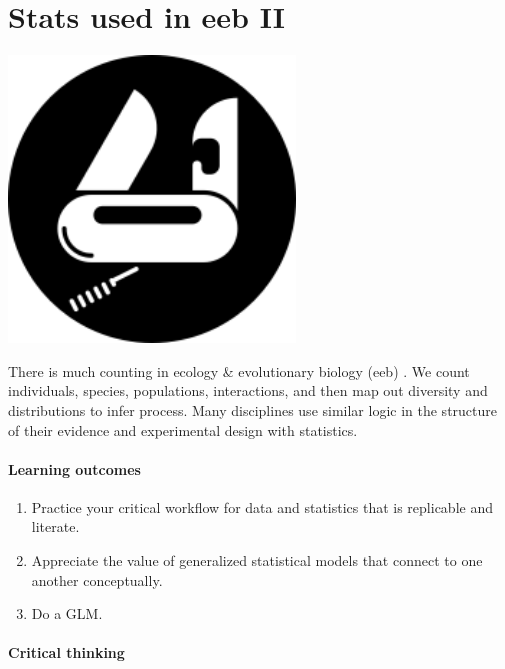 \documentclass[
]{book}
\providecommand{\tightlist}{%
  \setlength{\itemsep}{0pt}\setlength{\parskip}{0pt}}
\begin{document}
\hypertarget{eebII}{%
\chapter{Stats used in eeb II}\label{eebII}}

\includegraphics[width=3in,height=\textheight]{./eebII.png}

There is much counting in ecology \& evolutionary biology (eeb) \citep{RN7219}. We count individuals, species, populations, interactions, and then map out diversity and distributions to infer process. Many disciplines use similar logic in the structure of their evidence and experimental design with statistics.

\hypertarget{learning-outcomes-4}{%
\subsubsection*{Learning outcomes}\label{learning-outcomes-4}}

\begin{enumerate}
\def\labelenumi{\arabic{enumi}.}
\tightlist
\item
  Practice your critical workflow for data and statistics that is replicable and literate.\\
\item
  Appreciate the value of generalized statistical models that connect to one another conceptually.\\
\item
  Do a GLM.
\end{enumerate}

\hypertarget{critical-thinking-3}{%
\subsubsection*{Critical thinking}\label{critical-thinking-3}}
\end{document}
